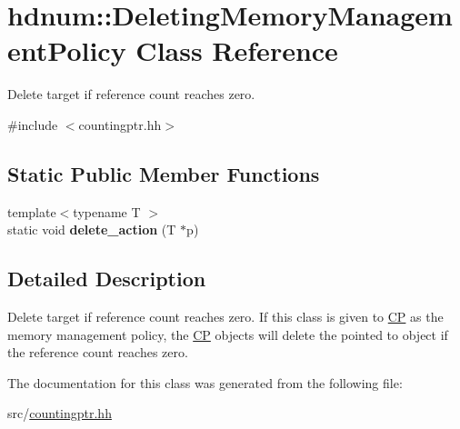 \hypertarget{classhdnum_1_1DeletingMemoryManagementPolicy}{
\section{hdnum::DeletingMemoryManagementPolicy Class Reference}
\label{classhdnum_1_1DeletingMemoryManagementPolicy}
}


Delete target if reference count reaches zero.  




{\ttfamily \#include $<$countingptr.hh$>$}

\subsection*{Static Public Member Functions}
\begin{DoxyCompactItemize}
\item 
\hypertarget{classhdnum_1_1DeletingMemoryManagementPolicy_a39e3349b6f0e03ecf992f31f9da9ccb9}{
{\footnotesize template$<$typename T $>$ }\\static void {\bfseries delete\_\-action} (T $\ast$p)}
\label{classhdnum_1_1DeletingMemoryManagementPolicy_a39e3349b6f0e03ecf992f31f9da9ccb9}

\end{DoxyCompactItemize}


\subsection{Detailed Description}
Delete target if reference count reaches zero. If this class is given to \hyperlink{classhdnum_1_1CP}{CP} as the memory management policy, the \hyperlink{classhdnum_1_1CP}{CP} objects will delete the pointed to object if the reference count reaches zero. 

The documentation for this class was generated from the following file:\begin{DoxyCompactItemize}
\item 
src/\hyperlink{countingptr_8hh}{countingptr.hh}\end{DoxyCompactItemize}
